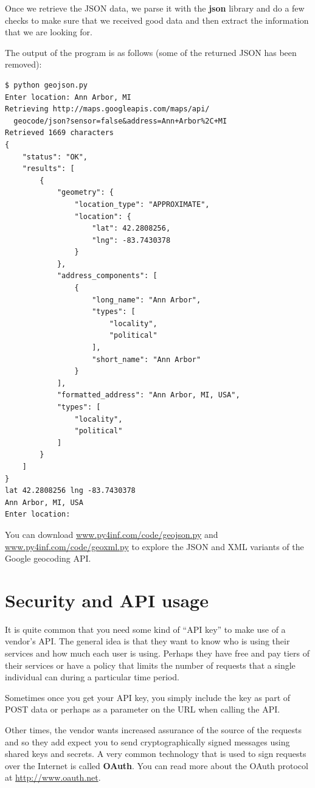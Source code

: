 \documentclass[11pt]{book}
\begin{document}
Once we retrieve the JSON data, we parse it with the {\bf json}
library and do a few checks to make sure that we received good data 
and then extract the information that we are looking for.

The output of the program is as follows (some of the returned
JSON has been removed):

\beforeverb
\begin{verbatim}
$ python geojson.py
Enter location: Ann Arbor, MI
Retrieving http://maps.googleapis.com/maps/api/
  geocode/json?sensor=false&address=Ann+Arbor%2C+MI
Retrieved 1669 characters
{
    "status": "OK", 
    "results": [
        {
            "geometry": {
                "location_type": "APPROXIMATE", 
                "location": {
                    "lat": 42.2808256, 
                    "lng": -83.7430378
                }
            }, 
            "address_components": [
                {
                    "long_name": "Ann Arbor", 
                    "types": [
                        "locality", 
                        "political"
                    ], 
                    "short_name": "Ann Arbor"
                } 
            ], 
            "formatted_address": "Ann Arbor, MI, USA", 
            "types": [
                "locality", 
                "political"
            ]
        }
    ]
}
lat 42.2808256 lng -83.7430378
Ann Arbor, MI, USA
Enter location:
\end{verbatim}
\afterverb
%
You can download 
\url{www.py4inf.com/code/geojson.py} and 
\url{www.py4inf.com/code/geoxml.py} to explore the JSON
and XML variants of the Google geocoding API. 

\section{Security and API usage}

It is quite common that you need some kind of 
``API key'' to make use of a vendor's API.  The
general idea is that they want to know who is using 
their services and how much each user is using.  
Perhaps they have free and pay tiers of their services
or have a policy that limits the number of requests 
that a single individual can during a particular 
time period.

Sometimes once you get your API key, you simply include
the key as part of POST data or perhaps as a parameter
on the URL when calling the API.

Other times, the vendor wants increased assurance of
the source of the requests and so they add expect you 
to send cryptographically signed messages using shared
keys and secrets.   A very common technology that is used 
to sign requests over the Internet is called {\bf OAuth}.
You can read more about the OAuth protocol at
\url{http://www.oauth.net}.
\end{document}
